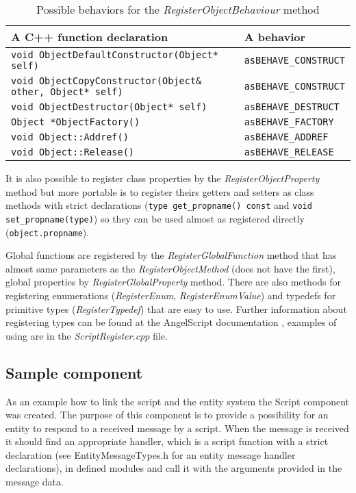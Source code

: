 \begin{table}[htbp]
	\centering
		{\scriptsize
		\begin{tabular}{|p{0.63\hsize}|p{0.30\hsize}|}
		\hline
		A C++ function declaration & A behavior\\
		\hline
		\verb/void ObjectDefaultConstructor(Object* self)/ & \verb/asBEHAVE_CONSTRUCT/\\
		\verb/void ObjectCopyConstructor(Object& other, Object* self)/ & \verb/asBEHAVE_CONSTRUCT/\\
		\verb/void ObjectDestructor(Object* self)/ & \verb/asBEHAVE_DESTRUCT/\\
		\verb/Object *ObjectFactory()/ & \verb/asBEHAVE_FACTORY/\\
		\verb/void Object::Addref()/ & \verb/asBEHAVE_ADDREF/\\
		\verb/void Object::Release()/ & \verb/asBEHAVE_RELEASE/\\
		\hline
		\end{tabular}
		}
	\caption{Possible behaviors for the \emph{RegisterObjectBehaviour} method}
	\label{tab:script-behaviors}
\end{table}

It is also possible to register class properties by the \emph{RegisterObjectProperty} method but more portable is to register theirs getters and setters as class methods with strict declarations (\verb/type get_propname() const/ and \verb/void set_propname(type)/) so they can be used almost as registered directly (\verb/object.propname/).

Global functions are registered by the \emph{RegisterGlobalFunction} method that has almost same parameters as the \emph{RegisterObjectMethod} (does not have the first), global properties by \emph{RegisterGlobalProperty} method. There are also methods for registering enumerations (\emph{RegisterEnum}, \emph{RegisterEnumValue}) and typedefs for primitive types (\emph{RegisterTypedef}) that are easy to use. Further information about registering types can be found at the AngelScript documentation \cite{angelscript}, examples of using are in the \emph{ScriptRegister.cpp} file.

\subsection{Sample component}
\label{sub:script-component}

As an example how to link the script and the entity system the Script component was created. The purpose of this component is to provide a possibility for an entity to respond to a received message by a script. When the message is received it should find an appropriate handler, which is a script function with a strict declaration (see EntityMessageTypes.h for an entity message handler declarations), in defined modules and call it with the arguments provided in the message data.

